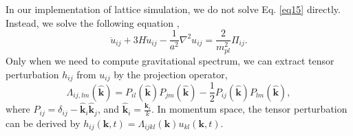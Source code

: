 \documentclass[12pt, a4paper]{article}
\begin{document}
In our implementation of lattice simulation, we do not solve Eq. \ref{eq15} directly. Instead, we solve the following equation \cite{Bethke:2013vca},
\begin{equation}
  \ddot{u}_{ij}+3H\dot{u}_{ij}-\frac{1}{a^2}\nabla^2 u_{ij}=\frac{2}{m^2_{pl}}\Pi_{ij}.
\end{equation}
Only when we need to compute gravitational spectrum, we can extract tensor perturbation $h_{ij}$ from $u_{ij}$ by the projection operator,
\begin{equation}
  \Lambda_{ij,lm}\left(\hat{\bm{k}}\right)=P_{il}\left(\hat{\bm{k}}\right)P_{jm}\left(\hat{\bm{k}}\right)-\frac{1}{2}P_{ij}\left(\hat{\bm{k}}\right)P_{lm}\left(\hat{\bm{k}}\right),
\end{equation}
where $P_{ij}=\delta_{ij}-\hat{\bm{k}}_i\hat{\bm{k}}_j$, and $\hat{\bm{k}}_i=\frac{\bm{k}_i}{k}$. In momentum space, the tensor perturbation can be derived by $h_{ij}\left(\bm{k},t\right)=\Lambda_{ijkl}\left(\bm{k}\right)u_{kl}\left(\bm{k},t\right)$.
\end{document}
